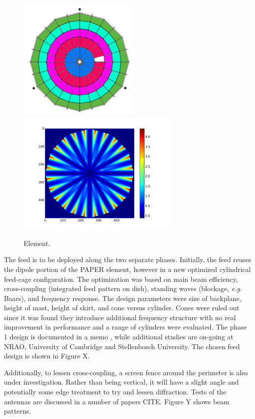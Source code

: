 \documentclass[preprint,11pt]{aastex}
\begin{document}
\begin{figure}[h!]
\centerline{
\includegraphics[height=6cm]{plots/antPlan.png}
\includegraphics[height=6cm]{plots/offset.png} 
}
\caption{\small Element.
\label{fig:elementplan}}
\end{figure}

The feed is to be deployed along the two separate phases.  Initially, the feed reuses the dipole portion of the PAPER element, however in a new optimized cylindrical feed-cage configuration.  The optimization was based on main beam efficiency, cross-coupling (integrated feed pattern on dish), standing waves (blockage, {\em e.g.} Baars), and frequency response.  The design parameters were size of backplane, height of mast, height of skirt, and cone versus cylinder.  Cones were ruled out since it was found they introduce additional frequency structure with no real improvement in performance and a range of cylinders were evaluated.  The phase 1 design is documented in a memo \cite{feedmemo}, while additional studies are on-going at NRAO, University of Cambridge and Stellenbosch University.  The chosen feed design is shown in Figure X.

Additionally, to lessen cross-coupling, a screen fence around the perimeter is also under investigation.  Rather than being vertical, it will have a slight angle and potentially some edge treatment to try and lessen diffraction.  Tests of the antennas are discussed in a number of papers CITE.  Figure Y shows beam patterns.
\end{document}
